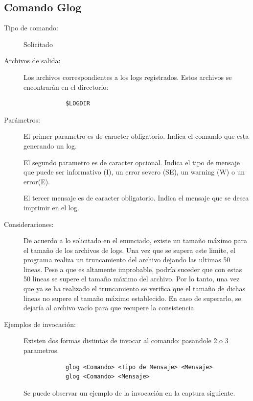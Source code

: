 \documentclass[12pt]{article}
\begin{document}
\subsection{Comando Glog}
\begin{description}
	\item [Tipo de comando:] Solicitado
	
	\item [Archivos de salida:] Los archivos correspondientes a los logs registrados. Estos archivos se encontrarán en el directorio: 
		\begin{verbatim}
			$LOGDIR
		\end{verbatim}
	
	\item [Parámetros:] 
		El primer parametro es de caracter obligatorio.  Indica el comando que esta generando un log.

		El segundo parametro es de caracter opcional. Indica el tipo de mensaje que puede ser informativo (I), un error severo (SE), un warning (W) o un error(E).
		
		El tercer mensaje es de caracter obligatorio. Indica el mensaje que se desea imprimir en el log.
		
	\item [Consideraciones:]
		De acuerdo a lo solicitado en el enunciado, existe un tamaño máximo para el tamaño de los archivos de logs. 
		Una vez que se supera este limite, el programa realiza un truncamiento del archivo dejando las ultimas 50 lineas.
		Pese a que es altamente improbable, podría suceder que con estas 50 lineas se supere el tamaño máximo del archivo.
		Por lo tanto, una vez que ya se ha realizado el truncamiento se verifica que el tamaño de dichas lineas no supere el tamaño máximo establecido.
		En caso de superarlo, se dejaría al archivo vacío para que recupere la consistencia.
		
	\item [Ejemplos de invocación:]
		
		Existen dos formas distintas de invocar al comando: pasandole 2 o 3 parametros.
		
		\begin{verbatim}
			glog <Comando> <Tipo de Mensaje> <Mensaje>
			glog <Comando> <Mensaje>
		\end{verbatim}
		
		Se puede observar un ejemplo de la invocación en la captura siguiente.
		

\end{description}
\end{document}
